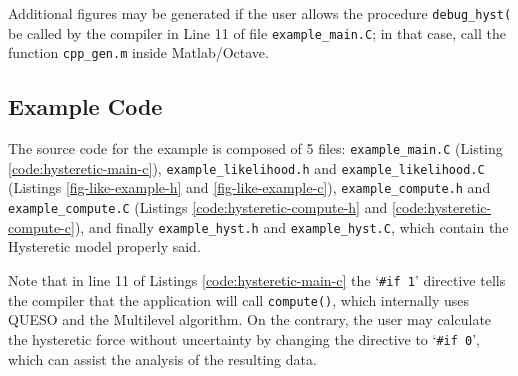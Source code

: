 Additional figures may be generated if the user allows the procedure \texttt{debug\_hyst(} be called by the compiler in Line 11 of file \texttt{example\_main.C}; in that case, call the function \texttt{cpp\_gen.m} inside Matlab/Octave. 


\subsection{Example Code}\label{sec:hysteretic-code}

The source code for the example is composed of 5 files:
\texttt{example\_main.C} (Listing \ref{code:hysteretic-main-c}), \linebreak
\texttt{example\_likelihood.h} and \texttt{example\_likelihood.C} (Listings \ref{fig-like-example-h} and \ref{fig-like-example-c}),
\texttt{example\_compute.h} and \texttt{example\_compute.C} (Listings \ref{code:hysteretic-compute-h} and \ref{code:hysteretic-compute-c}), and finally \texttt{example\_hyst.h} and \texttt{example\_hyst.C}, which contain the Hysteretic model properly said.


Note that in line 11 of Listings \ref{code:hysteretic-main-c} the `\verb+#if 1+' directive tells the compiler that the application will call \texttt{compute()}, which internally uses QUESO and the Multilevel algorithm. 
On the contrary, the user may calculate the hysteretic force without uncertainty by changing the directive to `\verb+#if 0+', which can assist the analysis of the resulting data.










 


